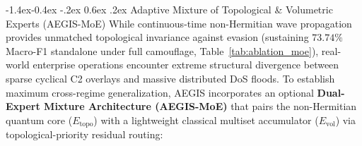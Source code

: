 \documentclass[10pt,twocolumn,letterpaper]{article}
\makeatletter
\renewcommand\subsection{\@startsection{subsection}{2}{\z@}%
                                     {-1.4ex\@plus -0.4ex \@minus -.2ex}%
                                     {0.6ex \@plus .2ex}%
                                     {\normalfont\normalsize\bfseries}}
\makeatother
\begin{document}
\subsection{Adaptive Mixture of Topological \& Volumetric Experts (AEGIS-MoE)}
While continuous-time non-Hermitian wave propagation provides unmatched topological invariance against evasion (sustaining $73.74\%$ Macro-F1 standalone under full camouflage, Table~\ref{tab:ablation_moe}), real-world enterprise operations encounter extreme structural divergence between sparse cyclical C2 overlays and massive distributed DoS floods. To establish maximum cross-regime generalization, AEGIS incorporates an optional \textbf{Dual-Expert Mixture Architecture (AEGIS-MoE)} that pairs the non-Hermitian quantum core ($E_{\text{topo}}$) with a lightweight classical multiset accumulator ($E_{\text{vol}}$) via topological-priority residual routing:
\end{document}
